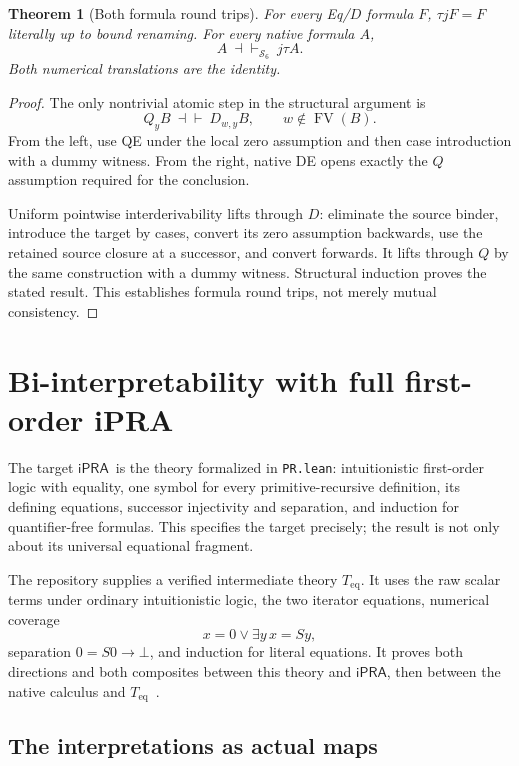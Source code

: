 \documentclass[11pt]{article}
\newtheorem{theorem}{Theorem}[section]
\theoremstyle{definition}\newtheorem{definition}[theorem]{Definition}
\theoremstyle{remark}\newtheorem{remark}[theorem]{Remark}
\newcommand{\ipra}{\ensuremath{\mathsf{iPRA}}}
\newcommand{\Ssix}{\ensuremath{\mathcal S_6}}
\newcommand{\FV}{\operatorname{FV}}
\begin{document}
\begin{theorem}[Both formula round trips]\label{thm:roundtrip}
For every Eq/$D$ formula $F$, $\tau jF=F$ literally up to bound renaming. For every native formula $A$,
\[
 A\ \dashv\vdash_{\Ssix}\ j\tau A.
\]
Both numerical translations are the identity.
\end{theorem}
\begin{proof}
The only nontrivial atomic step in the structural argument is
\[
 Q_yB\ \dashv\vdash\ D_{w,y}B,\qquad w\notin\FV(B).
\]
From the left, use QE under the local zero assumption and then case introduction with a dummy witness. From the right, native DE opens exactly the $Q$ assumption required for the conclusion.

Uniform pointwise interderivability lifts through $D$: eliminate the source binder, introduce the target by cases, convert its zero assumption backwards, use the retained source closure at a successor, and convert forwards. It lifts through $Q$ by the same construction with a dummy witness. Structural induction proves the stated result. This establishes formula round trips, not merely mutual consistency.
\end{proof}

\section{Bi-interpretability with full first-order iPRA}
\label{sec:biinterp}

The target \ipra\ is the theory formalized in \texttt{PR.lean}: intuitionistic first-order logic with equality, one symbol for every primitive-recursive definition, its defining equations, successor injectivity and separation, and induction for quantifier-free formulas. This specifies the target precisely; the result is not only about its universal equational fragment.

The repository supplies a verified intermediate theory $T_{\mathrm{eq}}$. It uses the raw scalar terms under ordinary intuitionistic logic, the two iterator equations, numerical coverage
\[
 x=0\lor\exists y\,x=Sy,
\]
separation $0=S0\to\bot$, and induction for literal equations. It proves both directions and both composites between this theory and \ipra, then between the native calculus and $T_{\mathrm{eq}}$~\cite{bridge,scalar}.

\subsection{The interpretations as actual maps}
\end{document}
